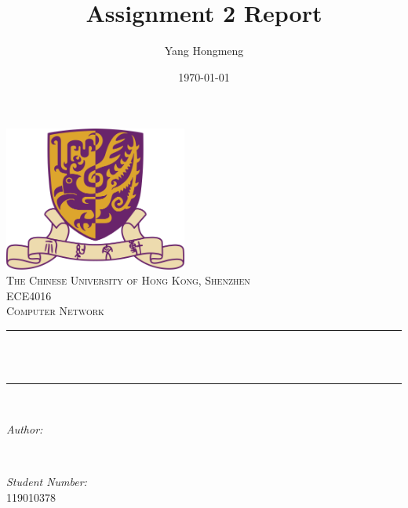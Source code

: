 \title{Assignment 2 Report} %
\author{Yang Hongmeng}%
\date{\today}%





\begin{titlepage}
    \centering
    \vspace*{0.5 cm}
    \includegraphics[scale = 0.75,width=6cm]{CUHK}\\[1.0 cm]   %
    \textsc{\large The Chinese University of Hong Kong, Shenzhen}\\[2.0 cm] 
    \textsc{\Large ECE4016}\\[0.5 cm] 
    \textsc{\large Computer Network}\\[0.5 cm]               %
    \rule{\linewidth}{0.2 mm} \\[0.4 cm]
    { \huge \bfseries \thetitle}\\
    \rule{\linewidth}{0.2 mm} \\[1.5 cm]
    
    \begin{minipage}{0.4\textwidth}
        \begin{flushleft} \large
            \emph{Author:}\\
            \theauthor
            \end{flushleft}
    \end{minipage}~
    \begin{minipage}{0.4\textwidth}
            \begin{flushleft} \large
            \emph{Student Number:} \\
             119010378  %
        \end{flushleft}
    \end{minipage}\\[2 cm]
    {\large \thedate}\\[2 cm]
 
    \vfill
    
\end{titlepage}
\tableofcontents
\pagebreak
\rmfamily

